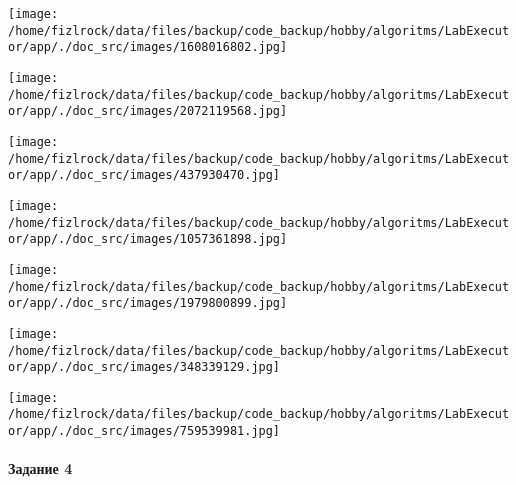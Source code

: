 \documentclass[a4paper, 12pt]{article}
\begin{document}
\texttt{[image: /home/fizlrock/data/files/backup/code\_backup/hobby/algoritms/LabExecutor/app/./doc\_src/images/1608016802.jpg]}

\texttt{[image: /home/fizlrock/data/files/backup/code\_backup/hobby/algoritms/LabExecutor/app/./doc\_src/images/2072119568.jpg]}

\texttt{[image: /home/fizlrock/data/files/backup/code\_backup/hobby/algoritms/LabExecutor/app/./doc\_src/images/437930470.jpg]}

\texttt{[image: /home/fizlrock/data/files/backup/code\_backup/hobby/algoritms/LabExecutor/app/./doc\_src/images/1057361898.jpg]}

\texttt{[image: /home/fizlrock/data/files/backup/code\_backup/hobby/algoritms/LabExecutor/app/./doc\_src/images/1979800899.jpg]}

\texttt{[image: /home/fizlrock/data/files/backup/code\_backup/hobby/algoritms/LabExecutor/app/./doc\_src/images/348339129.jpg]}

\texttt{[image: /home/fizlrock/data/files/backup/code\_backup/hobby/algoritms/LabExecutor/app/./doc\_src/images/759539981.jpg]}
\pagebreak
\paragraph{Задание 4}
\end{document}
